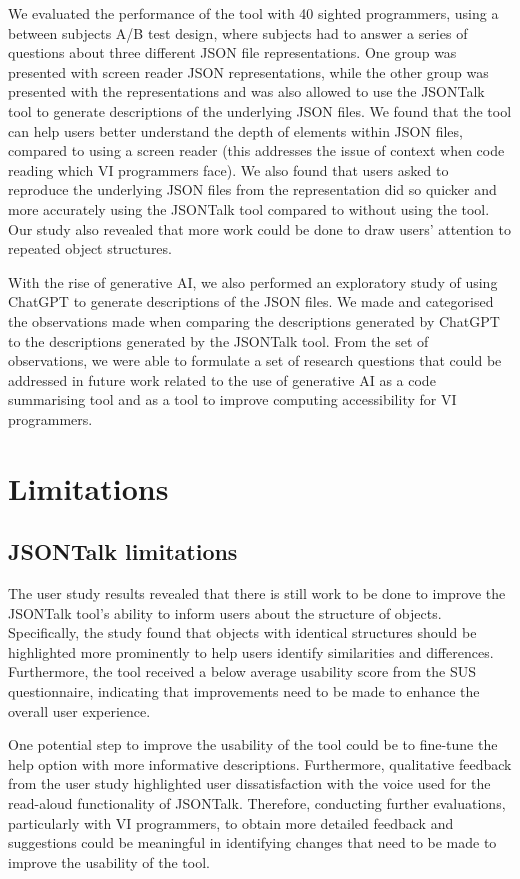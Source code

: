 \documentclass{l4proj}
\begin{document}
We evaluated the performance of the tool with 40 sighted programmers, using a between subjects A/B test design, where subjects had to answer a series of questions about three different JSON file representations. One group was presented with screen reader JSON representations, while the other group was presented with the representations and was also allowed to use the JSONTalk tool to generate descriptions of the underlying JSON files. We found that the tool can help users better understand the depth of elements within JSON files, compared to using a screen reader (this addresses the issue of context when code reading which VI programmers face). We also found that users asked to reproduce the underlying JSON files from the representation did so quicker and more accurately using the JSONTalk tool compared to without using the tool. Our study also revealed that more work could be done to draw users' attention to repeated object structures.

With the rise of generative AI, we also performed an exploratory study of using ChatGPT to generate descriptions of the JSON files. We made and categorised the observations made when comparing the descriptions generated by ChatGPT to the descriptions generated by the JSONTalk tool. From the set of observations, we were able to formulate a set of research questions that could be addressed in future work related to the use of generative AI as a code summarising tool and as a tool to improve computing accessibility for VI programmers.

\section{Limitations}

\subsection{JSONTalk limitations}

The user study results revealed that there is still work to be done to improve the JSONTalk tool's ability to inform users about the structure of objects. Specifically, the study found that objects with identical structures should be highlighted more prominently to help users identify similarities and differences. Furthermore, the tool received a below average usability score from the SUS questionnaire, indicating that improvements need to be made to enhance the overall user experience.

One potential step to improve the usability of the tool could be to fine-tune the help option with more informative descriptions. Furthermore, qualitative feedback from the user study highlighted user dissatisfaction with the voice used for the read-aloud functionality of JSONTalk. Therefore, conducting further evaluations, particularly with VI programmers, to obtain more detailed feedback and suggestions could be meaningful in identifying changes that need to be made to improve the usability of the tool.
\end{document}
